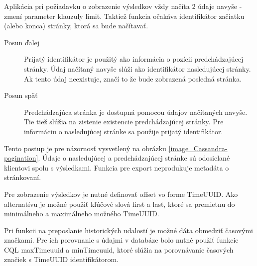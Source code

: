 		Aplikácia pri požiadavku o zobrazenie výsledkov vždy načíta 2 údaje navyše - zmení parameter klauzuly limit. Taktiež funkcia očakáva identifikátor začiatku (alebo konca) stránky, ktorá sa bude načítavať.
		\begin{description}
			\item[Posun ďalej] Prijatý identifikátor je použitý ako informácia o pozícii predchádzajúcej stránky. Údaj načítaný navyše slúži ako identifikátor nasledujúcej stránky. Ak tento údaj neexistuje, značí to že bude zobrazená posledná stránka.
				
			\item[Posun späť] Predchádzajúca stránka je dostupná pomocou údajov načítaných navyše. Tie tiež slúžia na zistenie existencie predchádzajúcej stránky. Pre informáciu o nasledujúcej stránke sa použije prijatý identifikátor.
		\end{description}
		
		Tento postup je pre názornosť vysvetlený na obrázku \ref{image_Cassandra-pagination}. Údaje o nasledujúcej a predchádzajúcej stránke sú odosielané klientovi spolu s výsledkami. Funkcia pre export neprodukuje metadáta o stránkovaní. 
		
		Pre zobrazenie výsledkov je nutné definovať offset vo forme TimeUUID. Ako alternatívu je možné použiť kľúčové slová first a last, ktoré sa premietnu do minimálneho a maximálneho možného TimeUUID.

		Pri funkcii na preposlanie historických udalostí je možné dáta obmedziť časovými značkami. Pre ich porovnanie s údajmi v databáze bolo nutné použiť funkcie CQL maxTimeuuid a minTimeuuid, ktoré slúžia na porovnávanie časových značiek s TimeUUID identifikátorom.
		
